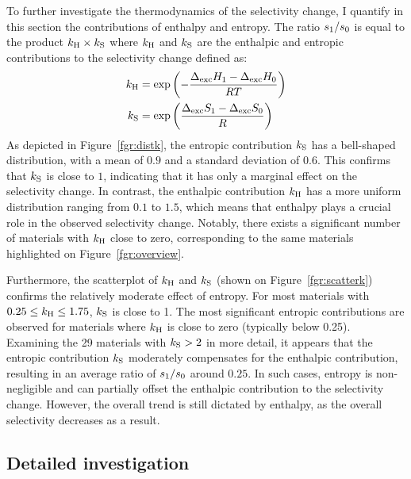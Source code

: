 \documentclass[main.tex]{subfiles}
\begin{document}
To further investigate the thermodynamics of the selectivity change, I quantify in this section the contributions of enthalpy and entropy. The ratio ${s_{\text{1}}}/{s_{\text{0}}}$ is equal to the product $k_{\text{H}} \times k_{\text{S}}$ where $k_{\text{H}}$ and $k_{\text{S}}$ are the enthalpic and entropic contributions to the selectivity change defined as:
\begin{equation}
\label{eq:effects}
    \begin{split}
      k_{\text{H}} & = \exp\left(-\dfrac{\Delta_{\text{exc}}H_{\text{1}}-\Delta_{\text{exc}}H_{\text{0}}}{RT}\right) \\ k_{\text{S}} & = \exp\left(\dfrac{\Delta_{\text{exc}}S_{\text{1}}-\Delta_{\text{exc}}S_{\text{0}}}{R}\right)
    \end{split}
\end{equation}
As depicted in Figure~\ref{fgr:distk}, the entropic contribution $k_{\text{S}}$ has a bell-shaped distribution, with a mean of $0.9$ and a standard deviation of $0.6$. This confirms that $k_{\text{S}}$ is close to $1$, indicating that it has only a marginal effect on the selectivity change. In contrast, the enthalpic contribution $k_{\text{H}}$ has a more uniform distribution ranging from $0.1$ to $1.5$, which means that enthalpy plays a crucial role in the observed selectivity change. Notably, there exists a significant number of materials with $k_{\text{H}}$ close to zero, corresponding to the same materials highlighted on Figure~\ref{fgr:overview}.

Furthermore, the scatterplot of $k_{\text{H}}$ and $k_{\text{S}}$ (shown on Figure~\ref{fgr:scatterk}) confirms the relatively moderate effect of entropy. For most materials with $0.25 \le k_{\text{H}} \le 1.75$, $k_{\text{S}}$ is close to 1. The most significant entropic contributions are observed for materials where $k_{\text{H}}$ is close to zero (typically below 0.25). Examining the 29 materials with $k_{\text{S}}>2$ in more detail, it appears that the entropic contribution $k_{\text{S}}$ moderately compensates for the enthalpic contribution, resulting in an average ratio of $s_{\text{1}}/s_{\text{0}}$ around $0.25$. In such cases, entropy is non-negligible and can partially offset the enthalpic contribution to the selectivity change. However, the overall trend is still dictated by enthalpy, as the overall selectivity decreases as a result.
  
\subsection{Detailed investigation}\label{sec:archetypes}
\end{document}
